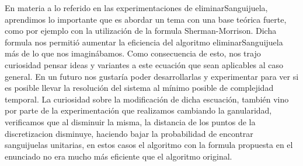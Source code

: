En materia a lo referido en las experimentaciones de eliminarSanguijuela, aprendimos lo importante que es abordar un tema con una base teórica fuerte, como por ejemplo con la utilización de la formula Sherman-Morrison. Dicha formula nos permitió aumentar la eficiencia del algoritmo eliminarSanguijuela más de lo que nos imaginábamos. Como consecuencia de esto, nos trajo curiosidad pensar ideas y variantes a este ecuación que sean aplicables al caso general. En un futuro nos gustaría poder desarrollarlas y experimentar para ver si es posible llevar la resolución del sistema al mínimo posible de complejidad temporal. La curiosidad sobre la modificación de dicha escuación, también vino por parte de la experimentación que realizamos cambiando la ganularidad, verificamos que al disminuir la misma, la distancia de los puntos de la discretizacion disminuye, haciendo bajar la probabilidad de encontrar sanguijuelas unitarias, en estos casos el algoritmo con la formula propuesta en el enunciado no era mucho más eficiente que el algoritmo original.

